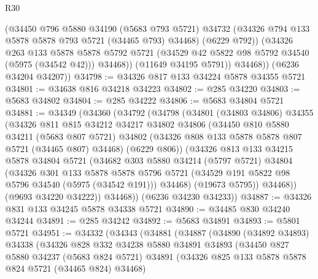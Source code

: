 \begin{lexlean}{R30}
\begin{coremodule}
              (@34450
                @796
                @5880
                @34190
                (@5683 @793 @5721)
                @34732
                (@34326 @794 @133 @5878 @5878 @793 @5721 (@34465 @793) @34468)
                (@6229 @792))
              (@34326
                @263
                @133
                @5878
                @5878
                @5792
                @5721
                (@34529 @42 @5822 @98 @5792 @34540 (@5975 (@34542 @42)))
                @34468))
            (@11649 @34195 @5791))
          @34468))
      (@6236 @34204 @34207))
@34798 := @34326 @817 @133 @34224 @5878 @34355 @5721
@34801 := @34638 @816 @34218 @34223
@34802 := @285 @34220
@34803 := @5683 @34802
@34804 := @285 @34222
@34806 := @5683 @34804 @5721
@34881 := @34349
    (@34360
      (@34792
        (@34798
          (@34801
            (@34803 @34806)
            @34355
            (@34326
              @811
              @815
              @34212
              @34217
              @34802
              @34806
              (@34450
                @810
                @5880
                @34211
                (@5683 @807 @5721)
                @34802
                (@34326 @808 @133 @5878 @5878 @807 @5721 (@34465 @807) @34468)
                (@6229 @806))
              (@34326
                @813
                @133
                @34215
                @5878
                @34804
                @5721
                (@34682
                  @303
                  @5880
                  @34214
                  (@5797 @5721)
                  @34804
                  (@34326
                    @301
                    @133
                    @5878
                    @5878
                    @5796
                    @5721
                    (@34529 @191 @5822 @98 @5796 @34540 (@5975 (@34542 @191)))
                    @34468)
                  (@19673 @5795))
                @34468))
            (@9693 @34220 @34222))
          @34468))
      (@6236 @34230 @34233))
@34887 := @34326 @831 @133 @34245 @5878 @34338 @5721
@34890 := @34485 @830 @34240 @34244
@34891 := @285 @34242
@34892 := @5683 @34891
@34893 := @5801 @5721
@34951 := @34332
    (@34343
      (@34881
        (@34887
          (@34890
            (@34892 @34893)
            @34338
            (@34326
              @828
              @332
              @34238
              @5880
              @34891
              @34893
              (@34450
                @827
                @5880
                @34237
                (@5683 @824 @5721)
                @34891
                (@34326 @825 @133 @5878 @5878 @824 @5721 (@34465 @824) @34468)

\end{coremodule}
\end{lexlean}
